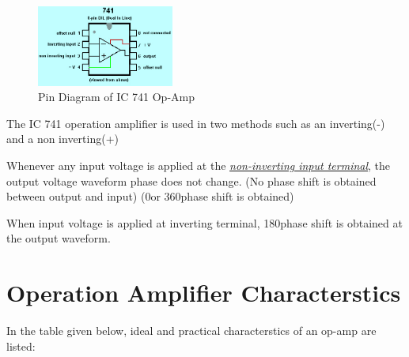 \documentclass[11pt,a4paper,oneside]{article}
\begin{document}
	\begin{figure}
		\centering
		\includegraphics[width=0.4\textwidth]{images/Pin-Diagram-of-IC-741.jpg}
		\caption{Pin Diagram of IC 741 Op-Amp}
	\end{figure}

	The IC 741 operation amplifier is used in two methods such as an inverting(-) and a non inverting(+)

	\noindent Whenever any input voltage is applied at the \emph{\underline{non-inverting input terminal}}, the output voltage waveform phase does not change. (No phase shift is obtained between output and input) (0\degree or 360\degree phase shift is obtained)

	When input voltage is applied at inverting terminal, 180\degree phase shift is obtained at the output waveform.

	\clearpage

	\section{Operation Amplifier Characterstics}

	In the table given below, ideal and practical characterstics of an op-amp are listed:
\end{document}
